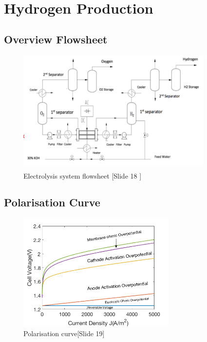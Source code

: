 

\section{Hydrogen Production}

    \subsection{Overview Flowsheet}
    \begin{figure}[H]
        \centering
        \includegraphics[width=0.87\textwidth]{flowsheet.png}
        \caption{Electrolysis system flowsheet [Slide 18 ]}
        \label{fig:plant_schematic}
    \end{figure}
    
  \subsection{Polarisation Curve}
\begin{figure}[H]
\centering
\includegraphics[width=0.7\textwidth]{pres3.png}
\caption{Polarisation curve[Slide 19]} 
\end{figure}    


